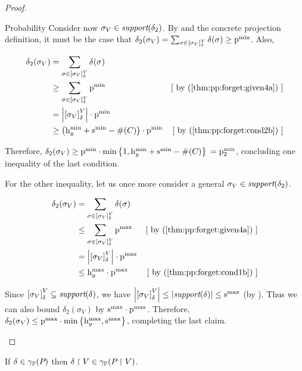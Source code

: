 \begin{proof}
\begin{subproof}{ Probability}
Consider now $ \sigma_V \in \textit{support}(\delta_2)
$. By  and the concrete projection
definition, it must be the case that $ \delta_2(\sigma_V)
= \sum_{\sigma \in \left[ \sigma_V \right]_{\delta}^{V}} \delta(\sigma) \geq \mathrm{p}^\mathrm{min}_{}
$.
Also,

\begin{align*}
\delta_2(\sigma_V)
& = \sum_{\sigma \in \eqclass{\sigma_V}{\delta}{V}} \delta(\sigma) \\
& \geq \sum_{\sigma \in \eqclass{\sigma_V}{\delta}{V}} \pmin{}
& \mathstep{by \cnumref{thm:pp:forget:given4a}}\\
& = \setsize{\eqclass{\sigma_V}{\delta}{V}} \cdot \pmin{} \\
& \geq \paren{\minh{y} + \smin{} - \psize{\getpoly{}}} \cdot \pmin{}
& \mathstep{by \cnumref{thm:pp:forget:cond2b}}
\end{align*}

Therefore,
$ \delta_2(\sigma_V) \geq \mathrm{p}^\mathrm{min}_{} \cdot \min\left\{ 1, \mathrm{h}^\mathrm{min}_{y}
+ \mathrm{s}^\mathrm{min}_{} - \#(C_{}) \right\} $ $ = \mathrm{p}^\mathrm{min}_{2} $, concluding one
inequality of the last condition.

For the other inequality, let us once more consider a general
$ \sigma_V \in \textit{support}(\delta_2) $. 

\begin{align*}
\delta_2(\sigma_V)
& = \sum_{\sigma \in \eqclass{\sigma_V}{\delta}{V}} \delta(\sigma) \\
& \leq \sum_{\sigma \in \eqclass{\sigma_V}{\delta}{V}} \pmax{}
& \mathstep{by \cnumref{thm:pp:forget:given4a}} \\
& = \setsize{\eqclass{\sigma_V}{\delta}{V}} \cdot \pmax{} \\
& \leq \maxh{y} \cdot \pmax{} & \mathstep{by \cnumref{thm:pp:forget:cond1b}}
\end{align*}

Since $ \left[ \sigma_V \right]_{\delta}^{V} \subseteq \textit{support}(\delta) $, we have
$ \left| \left[ \sigma_V \right]_{\delta}^{V} \right| \leq \left| \textit{support}(\delta) \right|
 \leq \mathrm{s}^\mathrm{max}_{} $ (by ). Thus we can also bound
 $ \delta_2 (\sigma_V) $ by $ \mathrm{s}^\mathrm{max}_{} \cdot \mathrm{p}^\mathrm{max}_{} $. Therefore,
 $ \delta_2(\sigma_V) \leq \mathrm{p}^\mathrm{max}_{} \cdot \min\left\{ \mathrm{h}^\mathrm{max}_{y}, \mathrm{s}^\mathrm{max}_{} \right\} $,
 completing the last claim.
\end{subproof}
\end{proof}

\begin{lemma} \label{lem:pp:project}
If $\delta \in \gamma_{\mathbb{P}}(P_{})$ then
$\delta \upharpoonright V \in \gamma_{\mathbb{P}}(P_{} \upharpoonright V)$.
\end{lemma}

